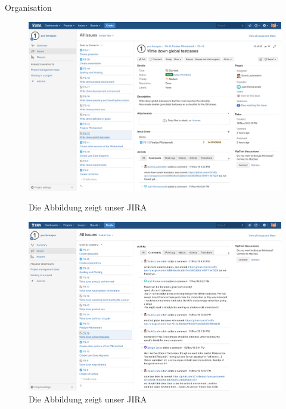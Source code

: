 \documentclass[18pt]{beamer}
\begin{document}
\begin{frame}[allowframebreaks]{Organisation}
	\begin{figure}
		\begin{center}
			\includegraphics[scale=0.16]{logos/JIRA01} 
		\end{center}
		\caption{Die Abbildung zeigt unser JIRA}
		\framebreak
		\begin{center}
			\includegraphics[scale=0.16]{logos/JIRA02} 
		\end{center}
		\caption{Die Abbildung zeigt unser JIRA}
	\end{figure}
	\framebreak
	\begin{figure}
		\begin{center}

\end{center}
\end{figure}
\end{frame}
\end{document}
